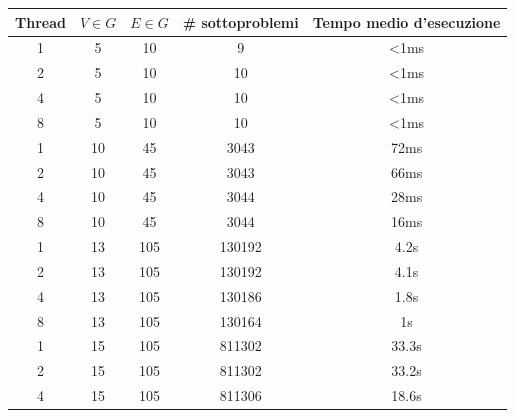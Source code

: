 \documentclass[
    article,            %
    12pt,                %
    oneside,            %
    a4paper,            %
    english,            %
    italian,                %
    sumario=tradicional,
]{abntex2}
\begin{document}
    \begin{center}
        \begin{tabular}{||c c c c c||}
            \hline
            Thread & $V\in G$ & $E\in G$ & \# sottoproblemi & Tempo medio d'esecuzione\\ [0.5ex]
            \hline\hline
            1      & 5        & 10       & 9                & <1ms                     \\
            \hline
            2      & 5        & 10       & 10               & <1ms                     \\
            \hline
            4      & 5        & 10       & 10               & <1ms                     \\
            \hline
            8      & 5        & 10       & 10               & <1ms                     \\
            \hline
            \hline
            1      & 10       & 45       & 3043             & 72ms                     \\
            \hline
            2      & 10       & 45       & 3043             & 66ms                     \\
            \hline
            4      & 10       & 45       & 3044             & 28ms                     \\
            \hline
            8      & 10       & 45       & 3044             & 16ms                     \\
            \hline
            \hline
            1      & 13       & 105      & 130192           & 4.2s                     \\
            \hline
            2      & 13       & 105      & 130192           & 4.1s                     \\
            \hline
            4      & 13       & 105      & 130186           & 1.8s                     \\
            \hline
            8      & 13       & 105      & 130164           & 1s                       \\
            \hline
            \hline
            1      & 15       & 105      & 811302           & 33.3s                    \\
            \hline
            2      & 15       & 105      & 811302           & 33.2s                    \\
            \hline
            4      & 15       & 105      & 811306           & 18.6s                    \\
            \hline

\end{tabular}
\end{center}
\end{document}

